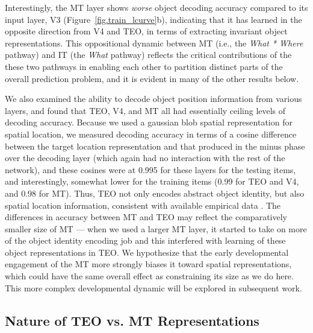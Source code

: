 \documentclass[11pt,twoside]{article}
\newif\myifpdf
\begin{document}
Interestingly, the MT layer shows {\em worse} object decoding accuracy compared to its input layer, V3 (Figure~\ref{fig.train_lcurve}b), indicating that it has learned in the opposite direction from V4 and TEO, in terms of extracting invariant object representations.  This oppositional dynamic between MT (i.e., the {\em What * Where} pathway) and IT (the {\em What} pathway) reflects the critical contributions of the these two pathways in enabling each other to partition distinct parts of the overall prediction problem, and it is evident in many of the other results below.

We also examined the ability to decode object position information from various layers, and found that TEO, V4, and MT all had essentially ceiling levels of decoding accuracy.  Because we used a gaussian blob spatial representation for spatial location, we measured decoding accuracy in terms of a cosine difference between the target location representation and that produced in the minus phase over the decoding layer (which again had no interaction with the rest of the network), and these cosines were at 0.995 for these layers for the testing items, and interestingly, somewhat lower for the training items (0.99 for TEO and V4, and 0.98 for MT).  Thus, TEO not only encodes abstract object identity, but also spatial location information, consistent with available empirical data \cite{MajajHongSolomonEtAl15}.  The differences in accuracy between MT and TEO may reflect the comparatively smaller size of MT --- when we used a larger MT layer, it started to take on more of the object identity encoding job and this interfered with learning of these object representations in TEO.  We hypothesize that the early developmental engagement of the MT more strongly biases it toward spatial representations, which could have the same overall effect as constraining its size as we do here.  This more complex developmental dynamic will be explored in subsequent work.

\subsection{Nature of TEO vs. MT Representations}
\end{document}
